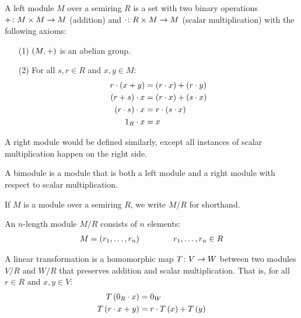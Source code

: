 \begin{definition}
  A left module \(M\) over a semiring \(R\)
  is a set with two binary operations
  \(+ \colon M \times M \to M\) (addition)
  and \(\cdot \colon R \times M \to M\) (scalar multiplication)
  with the following axioms:
  \begin{enumerate}
    \item[(1)]
      \(\left(M, +\right)\) is an abelian group.

    \item[(2)]
      For all \(s, r \in R\) and \(x ,y \in M\):
      \begin{align*}
        r \cdot \left(x + y\right)
          &= \left(r \cdot x\right) + \left(r \cdot y\right) \\
        \left(r + s\right) \cdot x
          &= \left(r \cdot x\right) + \left(s \cdot x\right) \\
        \left(r \cdot s\right) \cdot x
          &= r \cdot \left(s \cdot x\right) \\
        1_{R} \cdot x
          &= x
      \end{align*}
  \end{enumerate}
\end{definition}


\begin{definition}
  A right module would be defined similarly, except
  all instances of scalar multiplication happen on the right side.
\end{definition}


\begin{definition}
  A bimodule is a module that is both a left module and a right module
  with respect to scalar multiplication.
\end{definition}

If \(M\) is a module over a semiring \(R\),
we write \(M / R\) for shorthand.


\begin{definition}
  An \(n\)-length module \(M / R\)
  consists of \(n\) elements:
  \begin{align*}
    M = \left(r_1, \ldots, r_n\right)
    \qquad
    \qquad
    r_1, \ldots, r_n \in R
  \end{align*}
  
\end{definition}


\begin{definition}
  A linear transformation is a homomorphic map
  \(T \colon V \to W\) between two modules \(V / R\) and \(W / R\)
  that preserves addition and scalar multiplication.
  That is,
  for all \(r \in R\) and \(x, y \in V\):
  \begin{align*}
    T\left(0_R \cdot x\right)
      &= 0_W \\
    T\left(r\cdot x + y\right)
      &= r\cdot T\left(x\right) + T\left(y\right)
  \end{align*}
\end{definition}

